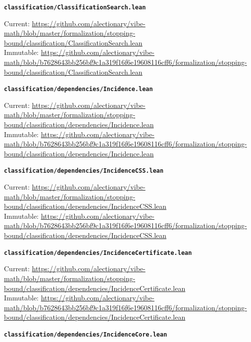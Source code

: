 \smallskip
\medskip
\par\noindent\textbf{\texttt{classification/ClassificationSearch.lean}}\par\nopagebreak
{\footnotesize\noindent Current: \url{https://github.com/alectionary/vibe-math/blob/master/formalization/stopping-bound/classification/ClassificationSearch.lean}\\
Immutable: \url{https://github.com/alectionary/vibe-math/blob/b7628643bb256bf9c1a319f16f6e19608116cff6/formalization/stopping-bound/classification/ClassificationSearch.lean}\par}
\smallskip
\medskip
\par\noindent\textbf{\texttt{classification/dependencies/Incidence.lean}}\par\nopagebreak
{\footnotesize\noindent Current: \url{https://github.com/alectionary/vibe-math/blob/master/formalization/stopping-bound/classification/dependencies/Incidence.lean}\\
Immutable: \url{https://github.com/alectionary/vibe-math/blob/b7628643bb256bf9c1a319f16f6e19608116cff6/formalization/stopping-bound/classification/dependencies/Incidence.lean}\par}
\smallskip
\medskip
\par\noindent\textbf{\texttt{classification/dependencies/IncidenceCSS.lean}}\par\nopagebreak
{\footnotesize\noindent Current: \url{https://github.com/alectionary/vibe-math/blob/master/formalization/stopping-bound/classification/dependencies/IncidenceCSS.lean}\\
Immutable: \url{https://github.com/alectionary/vibe-math/blob/b7628643bb256bf9c1a319f16f6e19608116cff6/formalization/stopping-bound/classification/dependencies/IncidenceCSS.lean}\par}
\smallskip
\medskip
\par\noindent\textbf{\texttt{classification/dependencies/IncidenceCertificate.lean}}\par\nopagebreak
{\footnotesize\noindent Current: \url{https://github.com/alectionary/vibe-math/blob/master/formalization/stopping-bound/classification/dependencies/IncidenceCertificate.lean}\\
Immutable: \url{https://github.com/alectionary/vibe-math/blob/b7628643bb256bf9c1a319f16f6e19608116cff6/formalization/stopping-bound/classification/dependencies/IncidenceCertificate.lean}\par}
\smallskip
\medskip
\par\noindent\textbf{\texttt{classification/dependencies/IncidenceCore.lean}}\par\nopagebreak
